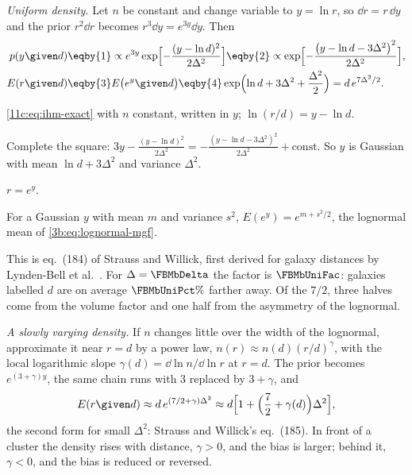 \emph{Uniform density.} Let $n$ be constant and change variable to $y=\ln r$, so
$\dd r=r\,\dd y$ and the prior $r^2\dd r$ becomes $r^3\dd y=e^{3y}\dd y$. Then
\begin{align}
  p(y\given d)
  &\eqby{1}\propto e^{3y}\exp\Bigl[-\frac{(y-\ln d)^2}{2\Delta^2}\Bigr]
   \eqby{2}\propto\exp\Bigl[-\frac{\bigl(y-\ln d-3\Delta^2\bigr)^2}{2\Delta^2}\Bigr],
  \nonumber\\
  E(r\given d)
  &\eqby{3}E\bigl(e^y\given d\bigr)
   \eqby{4}\exp\Bigl(\ln d+3\Delta^2+\frac{\Delta^2}{2}\Bigr)=d\,e^{7\Delta^2/2}.
  \label{11c:eq:ihm-uniform}
\end{align}
\begin{explain}
  \item \eqref{11c:eq:ihm-exact} with $n$ constant, written in $y$; $\ln(r/d)=y-\ln d$.
  \item Complete the square:
        $3y-\frac{(y-\ln d)^2}{2\Delta^2}=-\frac{(y-\ln d-3\Delta^2)^2}{2\Delta^2}+\text{const}$.
        So $y$ is Gaussian with mean $\ln d+3\Delta^2$ and variance $\Delta^2$.
  \item $r=e^y$.
  \item For a Gaussian $y$ with mean $m$ and variance $s^2$,
        $E(e^y)=e^{m+s^2/2}$, the lognormal mean of \eqref{3b:eq:lognormal-mgf}.
\end{explain}
This is eq.~(184) of Strauss and Willick, first derived for galaxy distances by
Lynden-Bell et al.\ \cite{LyndenBell1988}. For $\Delta=\FBMbDelta$ the factor is
$\FBMbUniFac$: galaxies labelled $d$ are on average $\FBMbUniPct\%$ farther away. Of the
$7/2$, three halves come from the volume factor and one half from the asymmetry of
the lognormal.

\emph{A slowly varying density.} If $n$ changes little over the width of the
lognormal, approximate it near $r=d$ by a power law, $n(r)\approx n(d)(r/d)^{\gamma}$,
with the local logarithmic slope $\gamma(d)=\dd\ln n/\dd\ln r$ at $r=d$. The prior
becomes $e^{(3+\gamma)y}$, the same chain runs with $3$ replaced by $3+\gamma$, and
\begin{equation}
  E(r\given d)\approx d\,e^{(7/2+\gamma)\Delta^2}\approx d\Bigl[1+\Bigl(\frac72+\gamma(d)\Bigr)\Delta^2\Bigr],
  \label{11c:eq:ihm-slow}
\end{equation}
the second form for small $\Delta^2$: Strauss and Willick's eq.~(185). In front of a
cluster the density rises with distance, $\gamma>0$, and the bias is larger; behind
it, $\gamma<0$, and the bias is reduced or reversed.

